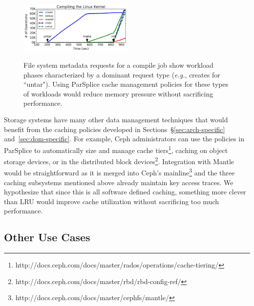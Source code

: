\begin{figure}[t]
\noindent\includegraphics[width=0.5\textwidth]{figures/compile-ops.png}\\
\caption{File system metadata requests for a compile job show workload phases
characterized by a dominant request type ({\it e.g.}, creates for ``untar").
Using ParSplice cache management policies for these types of workloads would
reduce memory pressure without sacrificing performance.
\label{fig:compile-ops}}
\end{figure}

Storage systems have many other data management techniques that would benefit
from the caching policies developed in Sections~\S\ref{sec:arch-specific}
and~\ref{sec:dom-specific}. For example, Ceph administrators can use the
policies in ParSplice to automatically size and manage cache
tiers\footnote{http://docs.ceph.com/docs/master/rados/operations/cache-tiering/},
caching on object storage devices, or in the distributed block
devices\footnote{http://docs.ceph.com/docs/master/rbd/rbd-config-ref/}.
Integration with Mantle would be straightforward as it is merged into Ceph's
mainline\footnote{http://docs.ceph.com/docs/master/cephfs/mantle/} and the
three caching subsystems mentioned above already maintain key access traces. We
hypothesize that since this is all software defined caching, something more
clever than LRU would improve cache utilization without sacrificing too much
performance.

\subsection{Other Use Cases}

